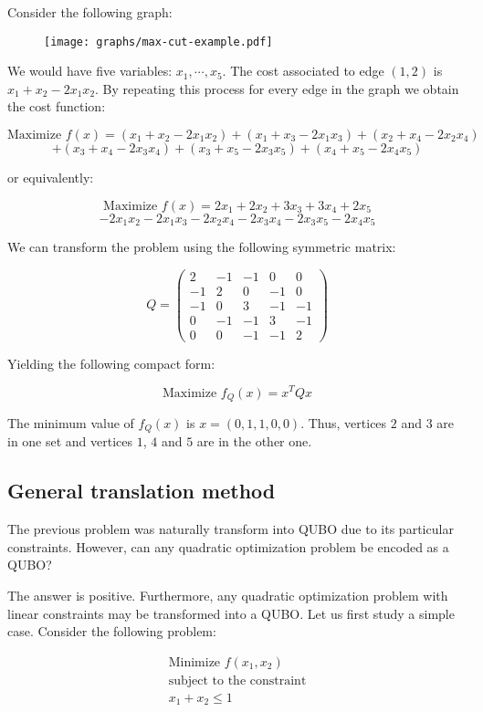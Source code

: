 Consider the following graph:

\begin{figure}[H]
	\texttt{[image: graphs/max-cut-example.pdf]}
	\centering
\end{figure}

We would have five variables: $x_1, \cdots, x_5$. The cost associated to edge $(1,2)$ is $x_1 + x_2 - 2 x_1 x_2$. By repeating this process for every edge in the graph we obtain the cost function:

$$ \text{Maximize  } f(x) = (x_1 + x_2 - 2 x_1 x_2) + (x_1 + x_3 - 2 x_1 x_3) + (x_2 + x_4 - 2 x_2 x_4) $$
$$ +(x_3 + x_4 - 2 x_3 x_4) + (x_3 + x_5 - 2 x_3 x_5) + (x_4 + x_5 - 2 x_4 x_5) $$

or equivalently:

$$ \text{Maximize  } f(x) = 2x_1 + 2x_2 + 3x_3 + 3x_4 + 2x_5$$ 
$$ - 2x_1x_2 - 2x_1x_3 - 2x_2x_4 - 2x_3x_4 - 2x_3x_5 - 2x_4x_5 $$

We can transform the problem using the following symmetric matrix:

$$
	Q = 
	\begin{pmatrix}
	2 & -1 & -1 & 0 & 0 \\
	-1 & 2 & 0 & -1 & 0 \\
	-1 & 0 & 3 & -1 & -1 \\
	0 & -1 & -1 & 3 & -1 \\
	0 & 0 & -1 & -1 & 2
	\end{pmatrix}
$$

Yielding the following compact form:

$$ \text{Maximize  } f_Q(x) = x^T Q x$$ 

The minimum value of $f_Q(x)$ is $x = (0, 1, 1, 0, 0)$. Thus, vertices $2$ and $3$ are in one set and vertices $1$, $4$ and $5$ are in the other one.


\subsection{General translation method}


The previous problem was naturally transform  into QUBO due to its particular constraints. However, can any quadratic optimization problem be encoded as a QUBO?

The answer is positive. Furthermore, any quadratic optimization problem with linear constraints may be transformed into a QUBO. Let us first study a simple case. Consider the following problem:

\begin{gather*}
	\text{Minimize } f(x_1, x_2) \\
	\text{subject to the constraint} \\
	x_1 + x_2 \leq 1
\end{gather*}

